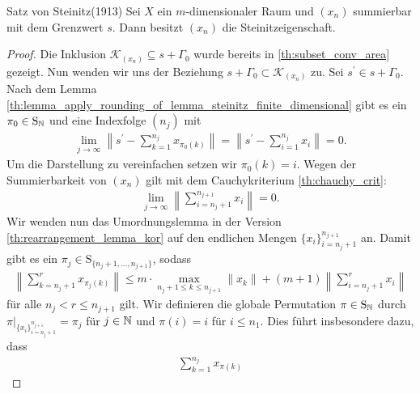 \begin{genericthm}{Satz von Steinitz(1913)}\label{th:lemma_of_steiniz}
	Sei $ X $ ein $ m $-dimensionaler Raum und $ (x_n) $ summierbar mit dem Grenzwert $ s $.
	Dann besitzt $ (x_n) $ die Steinitzeigenschaft.
\end{genericthm}
\begin{proof}
	Die Inklusion $ \mathcal{K}_{\left(x_n \right)} \subseteq
	s + \Gamma_0  $ wurde bereits in \ref{th:subset_conv_area} gezeigt. 
	Nun wenden wir uns der Beziehung $ s + \Gamma_0 \subset \mathcal{K}_{\left(  x_n \right)} $ zu.
	Sei $ s^\prime \in s + \Gamma_0 $. 
	Nach dem Lemma \ref{th:lemma_apply_rounding_of_lemma_steinitz_finite_dimensional} gibt es ein $ \pi_0 \in \mathrm{S}_{\mathbb{N}} $ und eine Indexfolge $ (n_j) $ mit
	\begin{align*}
		\lim \limits_{j \to \infty}
		\left\| s^\prime - \sum \limits_{k = 1}^{n_j} x_{\pi_0(k)} 
		\right\|
		=
		\left\| s^\prime - \sum \limits_{i = 1}^{n_j} x_{i} 
		\right\|
		 = 0.
	\end{align*}
	Um die Darstellung zu vereinfachen setzen wir $ \pi_0(k) = i $. 
	Wegen der Summierbarkeit von $ (x_n) $ gilt mit dem Cauchykriterium \ref{th:chauchy_crit}:
	\begin{align*}
		\lim \limits_{j \to \infty} \left\|  \sum \limits_{i = n_j +1}^{n_{j+1}} x_{i} 
		\right\| = 0.
	\end{align*}
	Wir wenden nun das Umordnungslemma in der Version \ref{th:rearrangement_lemma_kor} auf den endlichen Mengen
	$ \{ x_i \}_{i = n_j + 1}^{n_{j+1}} $ an.
	Damit gibt es ein $ \pi_j \in \mathrm{S}_{\{n_j + 1,..., n_{j+1}\}} $, sodass
	\begin{align*}
		\left\|
		\sum \limits_{k = n_j +1}^{r}
		x_{\pi_j(k)}
		\right\|
		\leq
		m \cdot \max \limits_{n_j + 1 \leq k \leq n_{j+1} } \| x_k \|
		+
		(m+1 ) 
		\left\| \sum \limits_{i = n_j +1}^r x_i \right\|
	\end{align*}
	für alle $ n_j < r \leq n_{j+1} $ gilt. 
	Wir definieren die globale Permutation $ \pi \in \mathrm{S}_{\mathbb{N}} $ durch\\ $ \pi\big|_{\{ x_i \}_{i = n_j + 1}^{n_{j+1}} } = \pi_j $ für $ j \in \mathbb{N} $ und $ \pi(i) = i $ für $ i \leq n_1 $.
	Dies führt insbesondere dazu, dass
	\begin{align*}
		\sum \limits_{k = 1}^{n_j} x_{\pi(k)}

\end{align*}
\end{proof}
